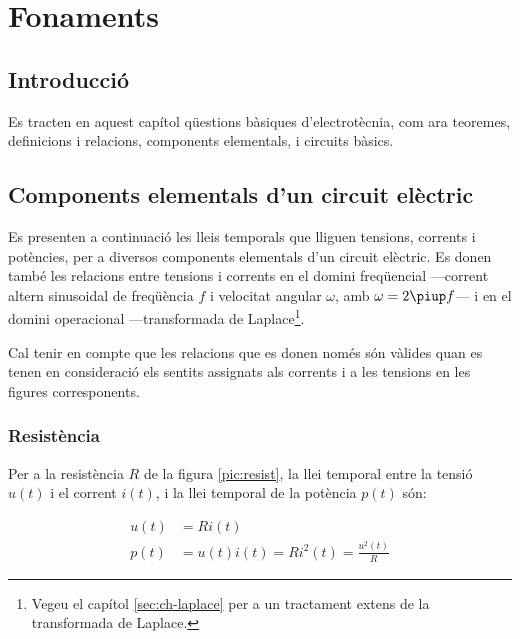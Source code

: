 \chapter{Fonaments}\label{ch:fonaments}

\section{Introducció}
Es tracten en aquest capítol qüestions bàsiques
d'electrotècnia, com ara teoremes, definicions i relacions, components elementals, i circuits bàsics.

\section{Components elementals d'un circuit elèctric}\label{sec:comp_elem}

Es presenten a continuació les lleis temporals que lliguen tensions,
corrents i potències, per a diversos components elementals d'un
circuit elèctric. Es donen també les relacions entre tensions i
corrents en el domini freqüencial ---corrent altern sinusoidal de freqüència $f$ i velocitat angular $\omega$, amb
$\omega=2\piup f$--- i en el domini operacional ---transformada de
Laplace\footnote{Vegeu el capítol \ref{sec:ch-laplace} per a un tractament extens de la transformada de Laplace.}.

Cal tenir en compte que les relacions que es donen només són
vàlides  quan es tenen en consideració els sentits assignats als
corrents i a les tensions en les figures corresponents.

\subsection{Resistència} 

Per a la resistència $R$ de la figura
\vref{pic:resist}, la llei temporal entre la tensió $u(t)$ i el
corrent $i(t)$, i la llei temporal de la potència $p(t)$ són:


\hfill
\begin{minipage}[b]{5cm}
	
	\label{pic:resist}
\end{minipage}
\hfill
\begin{minipage}[b][3.25cm][t]{8cm}
	\begin{align}
		u(t) &= R i(t) \\  p(t) &= u(t) i(t) = R i^2(t) = \frac{u^2(t)}{R}
	\end{align}
\end{minipage}

